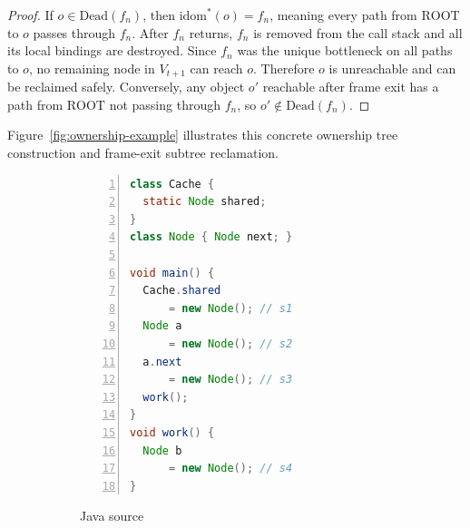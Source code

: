 \documentclass[12pt,a4paper]{article}
\newcommand{\ROOT}{\text{ROOT}}
\newcommand{\idom}{\text{idom}}
\begin{document}
\begin{proof}
If $o \in \text{Dead}(f_n)$, then $\idom^*(o) = f_n$, meaning every path from $\ROOT$ to $o$ passes through $f_n$. After $f_n$ returns, $f_n$ is removed from the call stack and all its local bindings are destroyed. Since $f_n$ was the unique bottleneck on all paths to $o$, no remaining node in $V_{t+1}$ can reach $o$. Therefore $o$ is unreachable and can be reclaimed safely. Conversely, any object $o'$ reachable after frame exit has a path from $\ROOT$ not passing through $f_n$, so $o' \notin \text{Dead}(f_n)$.
\end{proof}

Figure~\ref{fig:ownership-example} illustrates this concrete ownership tree construction and frame-exit subtree reclamation.

\begin{figure}[t]
\centering
\begin{subfigure}[t]{0.30\textwidth}
\centering
\begin{lstlisting}[language=Java,basicstyle=\ttfamily\scriptsize,numbers=left,numberstyle=\tiny,xleftmargin=1.5em]
class Cache {
  static Node shared;
}
class Node { Node next; }

void main() {
  Cache.shared
      = new Node(); // s1
  Node a
      = new Node(); // s2
  a.next
      = new Node(); // s3
  work();
}
void work() {
  Node b
      = new Node(); // s4
}
\end{lstlisting}
\caption{Java source}
\label{fig:ownership-code}
\end{subfigure}
\hfill
\begin{subfigure}[t]{0.33\textwidth}
\centering
{}
\end{subfigure}
\end{figure}
\end{document}

